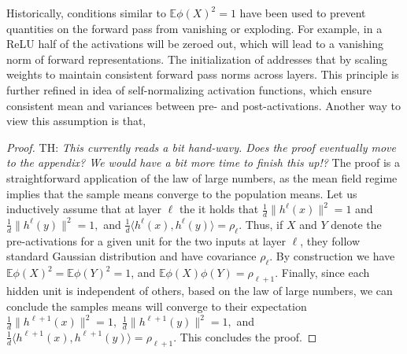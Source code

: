 \documentclass[twoside]{article}
\newcommand{\E}{\mathbb{E}}
\newtheorem{proposition}{Proposition}
\theoremstyle{definition}
\newcommand{\thomas}[1]{{\color{blue}TH:  \textit{#1}}}
\begin{document}

Historically, conditions similar to $\E \phi(X)^2=1$ have been used to prevent quantities on the forward pass from vanishing or exploding. For example, in a ReLU  half of the activations will be zeroed out, which will lead to a vanishing norm of forward representations. The initialization  of
\citep{he2016deep} addresses that by scaling weights to maintain consistent forward pass norms across layers. This principle is further refined in \citep{klambauer2017self} idea of self-normalizing activation functions, which ensure consistent mean and variances between pre- and post-activations. Another way to view this assumption is that, 


\begin{proof}
\thomas{This currently reads a bit hand-wavy. Does the proof eventually move to the appendix? We would have a bit more time to finish this up!?}
 The proof is a straightforward application of the law of large numbers, as the mean field regime implies that the sample means converge to the population means. Let us inductively assume that at layer $\ell$ the it holds that $\frac1d\|h^{\ell}(x)\|^2 = 1$ and $\frac1d\|h^{\ell}(y)\|^2=1,$ and $\frac1d\langle h^{\ell}(x),h^{\ell}(y)\rangle = \rho_{\ell}$. Thus, if $X$ and $Y$ denote the pre-activations for a given unit for the two inputs at layer $\ell$, they follow standard Gaussian distribution and have covariance $\rho_{\ell}.$ By construction we have $\E \phi(X)^2 = \E \phi(Y)^2 = 1$, and $\E \phi(X)\phi(Y) = \rho_{\ell+1}.$ Finally, since each hidden unit is independent of others, based on the law of large numbers, we can conclude the samples means will converge to their expectation $\frac1d \|h^{\ell+1}(x)\|^2 = 1, $ $\frac1d \|h^{\ell+1}(y)\|^2 = 1,$ and $\frac1d \langle h^{\ell+1}(x),h^{\ell+1}(y)\rangle = \rho_{\ell+1}. $ This concludes the proof. 
\end{proof}


\end{document}
